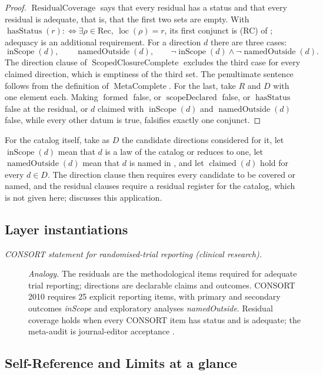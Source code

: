 \begin{proof}
\(\operatorname{ResidualCoverage}\) says that every residual has a status and
that every residual is adequate, that is, that the first two sets are empty.
With \(\operatorname{hasStatus}(r):\Longleftrightarrow\exists\rho\in\mathrm{Rec},\ \operatorname{loc}(\rho)=r\),
its first conjunct is (RC) of ; adequacy is an additional
requirement.
For a direction \(d\) there are three cases:
\[
  \operatorname{inScope}(d),\qquad
  \operatorname{namedOutside}(d),\qquad
  \neg\operatorname{inScope}(d)\wedge\neg\operatorname{namedOutside}(d).
\]
The direction clause of \(\operatorname{ScopedClosureComplete}\) excludes
the third case for every claimed direction, which is emptiness of the third
set. The penultimate sentence follows from the definition of
\(\operatorname{MetaComplete}\). For the last, take \(R\) and \(D\) with one
element each. Making \(\operatorname{formed}\) false, or
\(\operatorname{scopeDeclared}\) false, or \(\operatorname{hasStatus}\) false
at the residual, or \(d\) claimed with \(\operatorname{inScope}(d)\) and
\(\operatorname{namedOutside}(d)\) false, while every other datum is true,
falsifies exactly one conjunct.
\end{proof}

For the catalog itself, take as \(D\) the candidate directions
considered for it, let \(\operatorname{inScope}(d)\) mean that \(d\) is a
law of the catalog or reduces to one, let
\(\operatorname{namedOutside}(d)\) mean that \(d\) is named in
, and let \(\operatorname{claimed}(d)\) hold for
every \(d\in D\).  The direction clause then requires every candidate to
be covered or named, and the residual clauses require a residual
register for the catalog, which is not given here; 
discusses this application.

\subsection*{Layer instantiations}\label{layer-inst:F52}

\begingroup\small
\begin{description}
\item[\emph{{CONSORT} statement for randomised-trial
reporting (clinical research).}] \textit{Analogy.}
The residuals are the methodological items required
for adequate trial reporting; directions are
declarable claims and outcomes.  CONSORT 2010
requires 25 explicit reporting items, with primary
and secondary outcomes \emph{inScope} and
exploratory analyses \emph{namedOutside}.  Residual
coverage holds when every CONSORT item has status
and is adequate; the meta-audit is journal-editor
acceptance \citep{Schulz2010CONSORT}.

\end{description}
\endgroup


\clearpage
\subsection*{Self-Reference and Limits at a glance}\label{sec:self-reference-limits:summary}

\FloatBarrier
